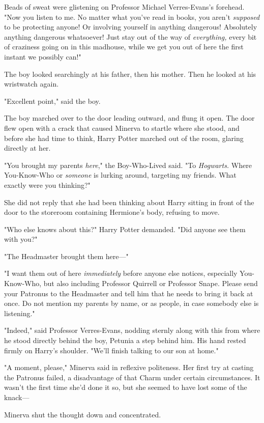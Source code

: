 Beads of sweat were glistening on Professor Michael Verres-Evans's forehead. 
"Now you listen to me. No matter what you've read in books, you aren't 
\emph{supposed} to be protecting anyone! Or involving yourself in anything 
dangerous! Absolutely anything dangerous whatsoever! Just stay out of the way 
of \emph{everything,} every bit of craziness going on in this madhouse, while 
we get you out of here the first instant we possibly can!"

The boy looked searchingly at his father, then his mother. Then he looked at 
his wristwatch again.

"Excellent point," said the boy.

The boy marched over to the door leading outward, and flung it open.
\sbreak
The door flew open with a crack that caused Minerva to startle where she stood, 
and before she had time to think, Harry Potter marched out of the room, glaring 
directly at her.

"You brought my parents \emph{here}," the Boy-Who-Lived said. "To 
\emph{Hogwarts.} Where You-Know-Who or \emph{someone} is lurking around, 
targeting my friends. What exactly were you thinking?"

She did not reply that she had been thinking about Harry sitting in front of 
the door to the storeroom containing Hermione's body, refusing to move.

"Who else knows about this?" Harry Potter demanded. "Did anyone see them with 
you?"

"The Headmaster brought them here---"

"I want them out of here \emph{immediately} before anyone else notices, 
especially You-Know-Who, but also including Professor Quirrell or Professor 
Snape. Please send your Patronus to the Headmaster and tell him that he needs 
to bring it back at once. Do not mention my parents by name, or as people, in 
case somebody else is listening."

"Indeed," said Professor Verres-Evans, nodding sternly along with this from 
where he stood directly behind the boy, Petunia a step behind him. His hand 
rested firmly on Harry's shoulder. "We'll finish talking to our son at home."

"A moment, please," Minerva said in reflexive politeness. Her first try at 
casting the Patronus failed, a disadvantage of that Charm under certain 
circumstances. It wasn't the first time she'd done it so, but she seemed to 
have lost some of the knack---

Minerva shut the thought down and concentrated.

